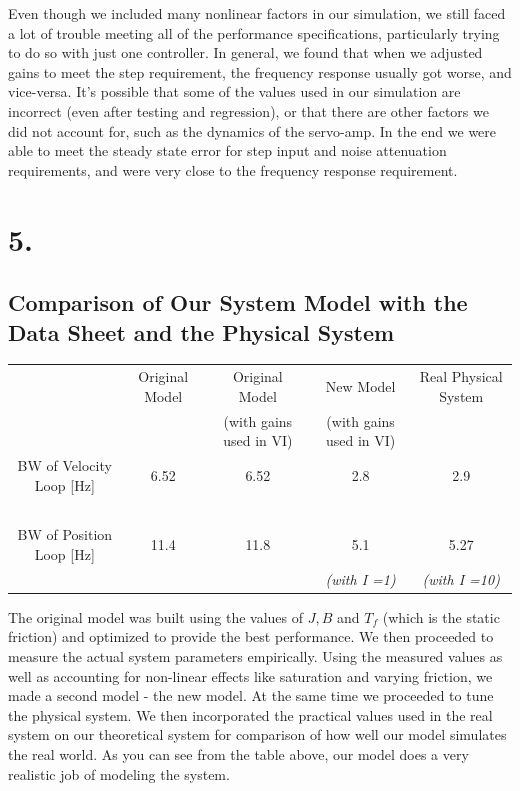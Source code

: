 \documentclass{article}
\theoremstyle{plain}
\theoremstyle{definition}
\theoremstyle{remark}
\begin{document}
Even though we included many nonlinear factors in our simulation, we still faced a lot of trouble meeting all of the performance specifications, particularly trying to do so with just one controller. In general, we found that when we adjusted gains to meet the step requirement, the frequency response usually got worse, and vice-versa. It's possible that some of the values used in our simulation are incorrect (even after testing and regression), or that there are other factors we did not account for, such as the dynamics of the servo-amp. In the end we were able to meet the steady state error for step input and noise attenuation requirements, and were very close to the frequency response requirement.\\


\clearpage 

\section*{5.}
\subsection*{ Comparison of Our System Model with the Data Sheet and the Physical System}
\begin{table}[htb]
    \begin{tabular}{|c|c|c|c|c|}
        \hline
        ~                        & Original Model & Original Model   & New Model & Real Physical System \\ 
	~	& ~	& (with gains used in VI)& (with gains used in VI)& ~\\ \hline
        BW of Velocity Loop [Hz] & 6.52           & 6.52                                    & 2.8                               & 2.9                  \\ 
	~&	~&	~&	~&	~\\
        BW of Position Loop [Hz] & 11.4           & 11.8                                    & 5.1                    & 5.27     \\
	~ &~	&~	&\emph{(with I =1)} & \emph{(with I =10)}\\
        \hline
    \end{tabular}
\end{table}

The original model was built using the values of $J, B$ and $T_f$ (which is the static friction) and optimized to provide the best performance. We then proceeded to measure the actual system parameters empirically. Using the measured values as well as accounting for non-linear effects like saturation and varying friction, we made a second model - the new model. At the same time we proceeded to tune the physical system. We then incorporated the practical values used in the real system on our theoretical system for comparison of how well our model simulates the real world. As you can see from the table above, our model does a very realistic job of modeling the system.
\end{document}
